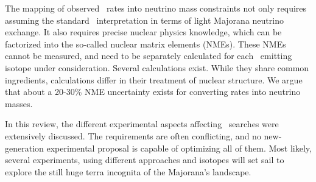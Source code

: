 The mapping of observed \bbonu\ rates into neutrino mass constraints not only requires assuming the standard \bbonu\ interpretation in terms of light Majorana neutrino exchange. It also requires precise nuclear physics knowledge, which can be factorized into the so-called nuclear matrix elements (NMEs). These NMEs cannot be measured, and need to be separately calculated for each \bb\ emitting isotope under consideration. Several calculations exist. While they share common ingredients, calculations differ in their treatment of nuclear structure. We argue that about a 20-30\% NME uncertainty exists for converting rates into neutrino masses. 

In this review, the different experimental aspects affecting \bbonu\ searches were extensively discussed. The requirements are often conflicting, and no new-generation experimental proposal is capable of optimizing all of them. Most likely, several experiments, using different approaches and isotopes will set sail to explore the still huge terra incognita of the Majorana's landscape. 





  

